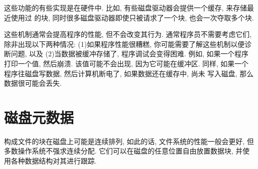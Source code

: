\documentclass[12pt]{book}
\begin{document}
{\begin{itemize}
\end{itemize}

%
这些功能的有些实现是在硬件中. 比如, 有些磁盘驱动器会提供一个缓存, 来存储最近使用过
的块, 同时很多磁盘驱动器即使只被请求了一个块, 也会一次夺取多个块.

这些机制通常会提高程序的性能, 但不会改变其行为.
通常程序员不需要考虑它们, 除非出现以下两种情况: 
(1)如果程序性能很糟糕, 你可能需要了解这些机制以便诊断问题, 以及
(2)当数据被缓冲存储了, 程序调试会变得困难. 
例如, 如果一个程序打印一个值, 然后崩溃. 该值可能不会出现, 因为它可能在缓冲区.
同样, 如果一个程序往磁盘写数据, 然后计算机断电了, 如果数据还在缓存中, 尚未
写入磁盘, 那么数据很可能会丢失.

\section{磁盘元数据}
%
构成文件的块在磁盘上可能是连续排列, 如此的话, 文件系统的性能一般会更好,
但多数操作系统不强求连续分配.
它们可以在磁盘的任意位置自由放置数据块, 并使用各种数据结构对其进行跟踪.

}
\end{document}
